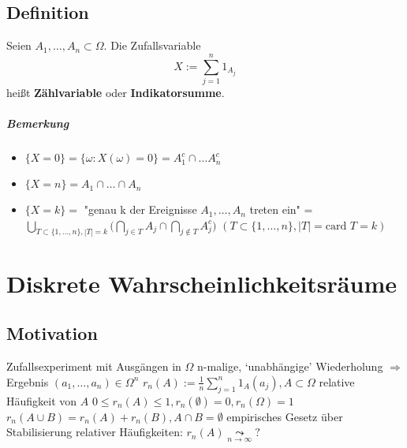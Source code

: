 \documentclass[a4paper,11pt,notitlepage]{report}
\begin{document}
\section{Definition}
Seien $A_1, \ldots, A_n \subset \Omega$. Die Zufallsvariable 
$$X := \sum\limits_{j=1}^{n}{1_{A_j}}$$ heißt \textbf{Zählvariable} oder \textbf{Indikatorsumme}.

\paragraph{Bemerkung}
\begin{itemize}
	\item $\{X=0\} = \{\omega \colon X(\omega) = 0 \} = A_{1}^c \cap \ldots A_{n}^c$
	\item $\{X = n \} = A_1 \cap \ldots \cap A_n$
	\item $\{X = k\} = $ "genau k der Ereignisse $A_1, \ldots, A_n$ treten ein" = $\bigcup\limits_{T \subset \{1, \ldots, n\}, |T|=k}{\bigl (\bigcap\limits_{j \in T}{A_j} \cap \bigcap\limits_{j \notin T}{A_{j}^c} \bigr )}$ \newline
$(T \subset \{1, \ldots, n\}, |T| = \text{card } T = k)$
\end{itemize}

\chapter{Diskrete Wahrscheinlichkeitsräume}

\section{Motivation}
Zufallsexperiment mit Ausgängen in $\Omega$
\newline
n-malige, `unabhängige' Wiederholung
\newline
$\Rightarrow$ Ergebnis $(a_1, \ldots, a_n) \in \Omega^n$
\newline
$r_n(A):= \frac{1}{n} \sum\limits_{j=1}^{n}{1_A(a_j)}, A \subset \Omega$ relative Häufigkeit von $A$
\newline
$0 \leq r_n(A) \leq 1, r_n(\emptyset) = 0, r_n(\Omega) = 1$
\newline
$r_n(A \cup B) = r_n(A) + r_n(B), A \cap B = \emptyset$
\newline
empirisches Gesetz über Stabilisierung relativer Häufigkeiten:
\newline
$r_n(A) \underset{n \rightarrow \infty}{\leadsto} ? $
\end{document}
